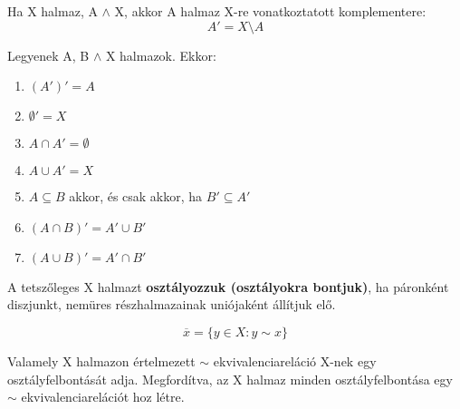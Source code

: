 \begin{frame}
\begin{tcolorbox}[title={Definíció: Komplementer}]
Ha X halmaz, A $\wedge$ X, akkor A halmaz X-re vonatkoztatott komplementere:\\
$$A' = X \setminus A$$
\end{tcolorbox}

\begin{tcolorbox}[title={Tétel: A komplementer tulajdonságai}]
Legyenek A, B $\wedge$ X halmazok. Ekkor:

\begin{enumerate}
\item $(A')' = A$
\item $\emptyset' = X$
\item $A \cap A' = \emptyset$
\item $A \cup A' = X$
\item $A \subseteq B$ akkor, és csak akkor, ha $B' \subseteq A'$
\item $(A \cap B)' = A' \cup B'$
\item $(A \cup B)' = A' \cap B'$
\end{enumerate}
\end{tcolorbox}
\end{frame}

\begin{frame}
\begin{tcolorbox}[title={Definíció: Halmaz osztályfelbontása}]
A tetszőleges X halmazt \textbf{osztályozzuk (osztályokra bontjuk)}, ha páronként diszjunkt, nemüres részhalmazainak uniójaként állítjuk elő.
\end{tcolorbox}

\begin{tcolorbox}[title={Az X $\in$ X elem \textbf{ekvivalencia osztálya}:}]
$$\overline{x} = \{y \in X : y \sim x\}$$
\end{tcolorbox}

\begin{tcolorbox}[title={Tétel: Ekvivalenciareláció és osztályfelbontás kapcsolata}]
Valamely X halmazon értelmezett $\sim$ ekvivalenciareláció X-nek egy osztályfelbontását adja. Megfordítva, az X halmaz minden osztályfelbontása egy $\sim$ ekvivalenciarelációt hoz létre.
\end{tcolorbox}

\begin{tcolorbox}[title={Biz}]
\end{tcolorbox}
\end{frame}

